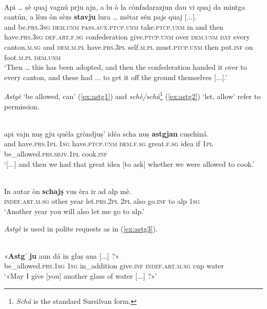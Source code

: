 \ea
\label{ex:stuaj2}
\\
\gll Api … ṣè quaj vagnú prju ajn, a lu ò la cònfadarazjun dau vi quaj da mintga cantún, a lèzs òn sèzs \textbf{stavju} lura … métar sén pajs quaj [...].\\
and {} be.\textsc{prs.3sg} \textsc{dem.unm} \textsc{pass.aux.ptcp.unm} take.\textsc{ptcp.unm} in and then have.\textsc{prs.3sg} \textsc{def.art.f.sg} confederation give.\textsc{ptcp.unm} over \textsc{dem.unm} \textsc{dat} every canton.\textsc{m.sg} and \textsc{dem.m.pl} have.\textsc{prs.3pl} self.\textsc{m.pl} must.\textsc{ptcp.unm} then {} put.\textsc{inf} on foot.\textsc{m.pl} \textsc{dem.unm}\\
\glt `Then … this has been adopted, and then the confederation handed it over to every canton, and these had ... to get it off the ground themselves [...].'
\z

\textit{Astgè} `be allowed, can' (\ref{ex:astg1}) and \textit{schè/schá}\footnote{\textit{Schá} is the standard Sursilvan form.} (\ref{ex:astg2}) `let, allow' refer to permission.

\ea
\label{ex:astg1}
\\
\gll[...] api vajn nuṣ gju quèla gròndjuṣ’ idéa scha nuṣ \textbf{astgjan} cuṣchiná.\\
{} and have.\textsc{prs.1pl} \textsc{1sg} have.\textsc{ptcp.unm} \textsc{dem.f.sg} great.\textsc{f.sg} idea if \textsc{1pl} be\_allowed.\textsc{prs.sbjv.1pl} cook.\textsc{inf}\\
\glt `[...] and then we had that great idea [to ask] whether we were allowed to cook.'
\z

\ea
\label{ex:astg2}
\\
\gll  In autar òn \textbf{schajṣ} vuṣ èra ir ad alp mè. \\
\textsc{indef.art.m.sg} other year let.\textsc{prs.2pl} \textsc{2pl} also go.\textsc{inf} to alp \textsc{1sg}\\
\glt `Another year you will also let me go to alp.'
\z

\textit{Astgè} is used in polite requests as in  (\ref{ex:astg3}).

\ea
\label{ex:astg3}
\\
	\gll  «\textbf{Astg}’ \textbf{ju} aun dá in glaṣ aua [...] ?»\\
be\_allowed.\textsc{prs.1sg} \textsc{1sg} in\_addition give.\textsc{inf} \textsc{indef.art.m.sg} cup water\\
\glt `«May I give [you] another glass of water [...] ?»'
\z

